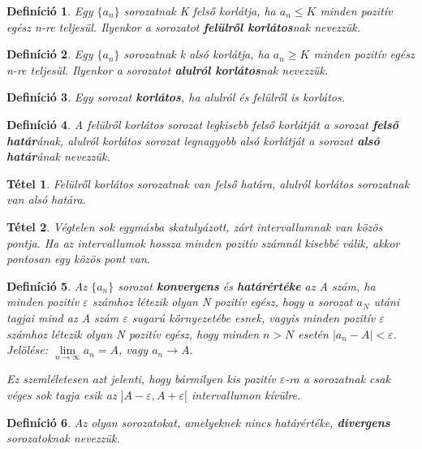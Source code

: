 \documentclass[12pt,a4paper]{article}
\newtheorem{theorem}{Tétel} [section]
\newtheorem{definition}{Definíció} [section]
\begin{document}
\begin{definition}
Egy $\{a_n\}$ sorozatnak K felső korlátja, ha $a_n \leq K$ minden pozitív egész n-re teljesül. Ilyenkor a sorozatot \textbf{felülről korlátos}nak nevezzük.
\end{definition}

\begin{definition}
Egy $\{a_n\}$ sorozatnak k alsó korlátja, ha $a_n \geq K$ minden pozitív egész n-re teljesül. Ilyenkor a sorozatot \textbf{alulról korlátos}nak nevezzük.
\end{definition}

\begin{definition}
 Egy sorozat \textbf{korlátos}, ha alulról és felülről is korlátos.
\end{definition}

\begin{definition}
A felülről korlátos sorozat legkisebb felső korlátját a sorozat \textbf{felső határ}ának, alulról korlátos sorozat legnagyobb alsó korlátját a sorozat \textbf{alsó határ}ának nevezzük.
\end{definition}

\begin{theorem}
 Felülről korlátos sorozatnak van felső határa, alulról korlátos sorozatnak van alsó határa.
\end{theorem}

\begin{theorem}
Végtelen sok egymásba skatulyázott, zárt intervallumnak van közös pontja. Ha az intervallumok hossza minden pozitív számnál kisebbé válik, akkor pontosan egy közös pont van.
\end{theorem}

\begin{definition}
Az $\{a_n\}$ sorozat \textbf{konvergens} és \textbf{határértéke} az A szám, ha minden pozitív $\varepsilon$ számhoz létezik olyan N pozitív egész, hogy a sorozat $a_N$ utáni tagjai mind az A szám $\varepsilon$ sugarú környezetébe esnek, vagyis minden pozitív $\varepsilon$ számhoz létezik olyan N pozitív egész, hogy minden $n > N$ esetén $|a_n - A|<\varepsilon$. Jelölése: $\lim\limits_{n \to \infty} a_n=A$, vagy $a_n \to A$.

Ez szemléletesen azt jelenti, hogy bármilyen kis pozitív $\varepsilon$-ra a sorozatnak csak véges sok tagja esik az $]A - \varepsilon, A + \varepsilon[$ intervallumon kívülre.
\end{definition}

\begin{definition}
Az olyan sorozatokat, amelyeknek nincs határértéke, \textbf{divergens} sorozatoknak nevezzük.
\end{definition}
\end{document}
